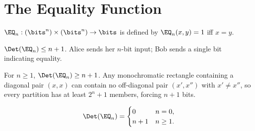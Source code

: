 \chapter{The Equality Function}

\begin{definition}
  \label{def:eq_fn}
  \leanok
  $\EQ_n : (\bits^n) \times (\bits^n) \to \bits$ is defined by
  $\EQ_n(x, y) = 1$ iff $x = y$.
\end{definition}

\begin{theorem}
  \label{thm:eq_upper}
  \leanok
  $\Det(\EQ_n) \le n + 1$.  Alice sends her $n$-bit input; Bob sends a single
  bit indicating equality.
\end{theorem}

\begin{theorem}
  \label{thm:eq_lower}
  \leanok
  For $n \ge 1$, $\Det(\EQ_n) \ge n + 1$.
  Any monochromatic rectangle containing a diagonal pair $(x,x)$ can contain no
  off-diagonal pair $(x',x'')$ with $x' \ne x''$, so every partition has at least
  $2^n + 1$ members, forcing $n + 1$ bits.
\end{theorem}

\begin{theorem}
  \label{thm:eq_exact}
  \leanok
  \[
    \Det(\EQ_n) = \begin{cases} 0 & n = 0, \\ n + 1 & n \ge 1. \end{cases}
  \]
\end{theorem}
